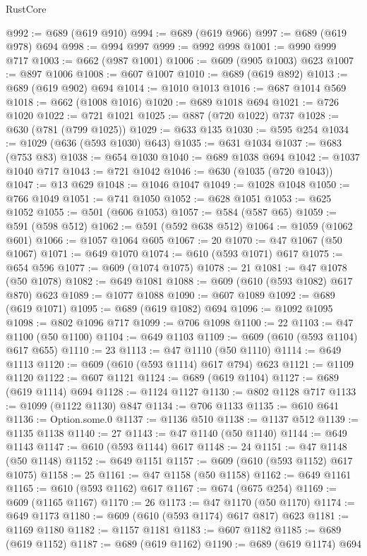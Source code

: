 \begin{lexlean}{RustCore}
\begin{coremodule}
@992 := @689 (@619 @910)
@994 := @689 (@619 @966)
@997 := @689 (@619 @978) @694
@998 := @994 @997
@999 := @992 @998
@1001 := @990 @999 @717
@1003 := @662 (@987 @1001)
@1006 := @609 (@905 @1003) @623
@1007 := @897 @1006
@1008 := @607 @1007
@1010 := @689 (@619 @892)
@1013 := @689 (@619 @902) @694
@1014 := @1010 @1013
@1016 := @687 @1014 @569
@1018 := @662 (@1008 @1016)
@1020 := @689 @1018 @694
@1021 := @726 @1020
@1022 := @721 @1021
@1025 := @887 (@720 @1022) @737
@1028 := @630 (@781 (@799 @1025))
@1029 := @633 @135
@1030 := @595 @254
@1034 := @1029 (@636 (@593 @1030) @643)
@1035 := @631 @1034
@1037 := @683 (@753 @83)
@1038 := @654 @1030
@1040 := @689 @1038 @694
@1042 := @1037 @1040 @717
@1043 := @721 @1042
@1046 := @630 (@1035 (@720 @1043))
@1047 := @13 @629
@1048 := @1046 @1047
@1049 := @1028 @1048
@1050 := @766 @1049
@1051 := @741 @1050
@1052 := @628 @1051
@1053 := @625 @1052
@1055 := @501 (@606 @1053)
@1057 := @584 (@587 @65)
@1059 := @591 (@598 @512)
@1062 := @591 (@592 @638 @512)
@1064 := @1059 (@1062 @601)
@1066 := @1057 @1064 @605
@1067 := 20
@1070 := @47 @1067 (@50 @1067)
@1071 := @649 @1070
@1074 := @610 (@593 @1071) @617
@1075 := @654 @596
@1077 := @609 (@1074 @1075)
@1078 := 21
@1081 := @47 @1078 (@50 @1078)
@1082 := @649 @1081
@1088 := @609 (@610 (@593 @1082) @617 @870) @623
@1089 := @1077 @1088
@1090 := @607 @1089
@1092 := @689 (@619 @1071)
@1095 := @689 (@619 @1082) @694
@1096 := @1092 @1095
@1098 := @802 @1096 @717
@1099 := @706 @1098
@1100 := 22
@1103 := @47 @1100 (@50 @1100)
@1104 := @649 @1103
@1109 := @609 (@610 (@593 @1104) @617 @655)
@1110 := 23
@1113 := @47 @1110 (@50 @1110)
@1114 := @649 @1113
@1120 := @609 (@610 (@593 @1114) @617 @794) @623
@1121 := @1109 @1120
@1122 := @607 @1121
@1124 := @689 (@619 @1104)
@1127 := @689 (@619 @1114) @694
@1128 := @1124 @1127
@1130 := @802 @1128 @717
@1133 := @1099 (@1122 @1130) @847
@1134 := @706 @1133
@1135 := @610 @641
@1136 := Option.some.{0}
@1137 := @1136 @510
@1138 := @1137 @512
@1139 := @1135 @1138
@1140 := 27
@1143 := @47 @1140 (@50 @1140)
@1144 := @649 @1143
@1147 := @610 (@593 @1144) @617
@1148 := 24
@1151 := @47 @1148 (@50 @1148)
@1152 := @649 @1151
@1157 := @609 (@610 (@593 @1152) @617 @1075)
@1158 := 25
@1161 := @47 @1158 (@50 @1158)
@1162 := @649 @1161
@1165 := @610 (@593 @1162) @617
@1167 := @674 (@675 @254)
@1169 := @609 (@1165 @1167)
@1170 := 26
@1173 := @47 @1170 (@50 @1170)
@1174 := @649 @1173
@1180 := @609 (@610 (@593 @1174) @617 @817) @623
@1181 := @1169 @1180
@1182 := @1157 @1181
@1183 := @607 @1182
@1185 := @689 (@619 @1152)
@1187 := @689 (@619 @1162)
@1190 := @689 (@619 @1174) @694

\end{coremodule}
\end{lexlean}
